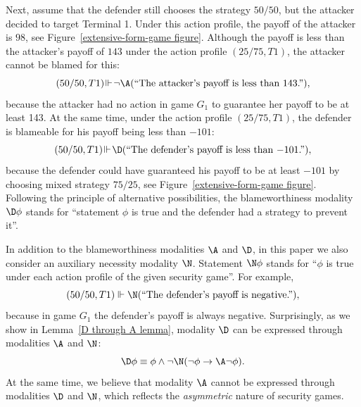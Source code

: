 \documentclass[letterpaper]{article}
\begin{document}
Next, assume that the defender still chooses the strategy $50/50$, but the attacker decided to target Terminal 1. Under this action profile, the payoff of the attacker is $98$, see Figure~\ref{extensive-form-game figure}. Although the payoff is less than the attacker's payoff of $143$ under the action profile $(25/75,T1)$, the attacker cannot be blamed for this:
$$
(50/50,T1)\!\Vdash\! \neg\A(\mbox{``The attacker's payoff is less than $143$.''}),
$$
because the attacker had no action in game $G_1$ to guarantee her payoff to be at least 143. At the same time, under the action profile $(25/75,T1)$, the defender is blameable for his payoff being less than $-101$:
$$
(50/50,T1)\!\Vdash\!\D(\mbox{``The defender's payoff is less than $-101$.''}),
$$
because the defender could have guaranteed his payoff to be at least $-101$ by choosing mixed strategy $75/25$, see Figure~\ref{extensive-form-game figure}. Following the principle of alternative possibilities, the blameworthiness modality $\D\phi$ stands for ``statement $\phi$ is true and the defender had a strategy to prevent it''.

In addition to the blameworthiness modalities $\A$ and $\D$, in this paper we also consider an auxiliary necessity modality $\N$. Statement $\N\phi$ stands for ``$\phi$ is true under each action profile of the given security game''. For example,
$$
(50/50,T1)\Vdash \N(\mbox{``The defender's payoff is negative.''}),
$$
because in game $G_1$ the defender's payoff is always negative. Surprisingly, as we show in Lemma~\ref{D through A lemma},  modality $\D$ can be expressed through modalities $\A$ and $\N$:
$$
\D\phi\equiv \phi\wedge \neg\N(\neg\phi\to\A\neg\phi).
$$
At the same time, we believe that modality $\A$ cannot be expressed through modalities $\D$ and $\N$, which reflects the {\em asymmetric} nature of security games.
\end{document}
